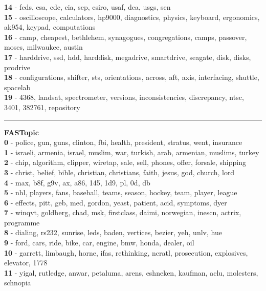 \textbf{14} - feds, esa, cdc, cia, sep, csiro, usaf, dea, usgs, sen\\
\textbf{15} - oscilloscope, calculators, hp9000, diagnostics, physics, keyboard, ergonomics, ak954, keypad, computations\\
\textbf{16} - camp, cheapest, bethlehem, synagogues, congregations, camps, passover, moses, milwaukee, austin\\
\textbf{17} - harddrive, ssd, hdd, harddisk, megadrive, smartdrive, seagate, disk, disks, prodrive\\
\textbf{18} - configurations, shifter, sts, orientations, across, aft, axis, interfacing, shuttle, spacelab\\
\textbf{19} - 4368, landsat, spectrometer, versions, inconsistencies, discrepancy, ntsc, 3401, 382761, repository\\
\hrule\vspace{2mm}
\noindent
\textbf{FASTopic}\vspace{2mm}\\
\vspace{2mm}
\noindent
\textbf{0} - police, gun, guns, clinton, fbi, health, president, stratus, went, insurance\\
\textbf{1} - israeli, armenia, israel, muslim, war, turkish, arab, armenian, muslims, turkey\\
\textbf{2} - chip, algorithm, clipper, wiretap, sale, sell, phones, offer, forsale, shipping\\
\textbf{3} - christ, belief, bible, christian, christians, faith, jesus, god, church, lord\\
\textbf{4} - max, b8f, g9v, ax, a86, 145, 1d9, pl, 0d, db\\
\textbf{5} - nhl, players, fans, baseball, teams, season, hockey, team, player, league\\
\textbf{6} - effects, pitt, geb, med, gordon, yeast, patient, acid, symptoms, dyer\\
\textbf{7} - winqvt, goldberg, chad, msk, firstclass, daimi, norwegian, inescn, actrix, programme\\
\textbf{8} - dialing, rs232, sunrise, leds, baden, vertices, bezier, yeh, unlv, hue\\
\textbf{9} - ford, cars, ride, bike, car, engine, bmw, honda, dealer, oil\\
\textbf{10} - garrett, limbaugh, horne, ifas, rethinking, ncratl, prosecution, explosives, elevator, 1778\\
\textbf{11} - yigal, rutledge, anwar, petaluma, arens, eshneken, kaufman, aclu, molesters, schnopia\\
